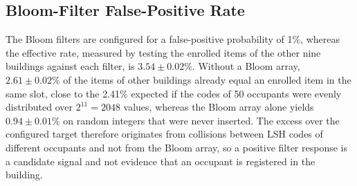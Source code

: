 \documentclass[pdflatex,sn-mathphys-num]{sn-jnl}%
\theoremstyle{thmstyleone}%
\theoremstyle{thmstyletwo}%
\theoremstyle{thmstylethree}%
\begin{document}
\begin{table}[!t]
\caption{Comparison of centralized (exhaustive) search and the verification policies for 10 buildings and a shortlist of five: mean over 20 random building assignments with 95\% confidence half-widths ($\pm$). The adaptive policy uses a score-gap threshold of 5: all five shortlisted buildings are verified when the top two routing scores differ by at most 5, and the sequential rule is used otherwise. Payload is the captured-embedding traffic per attempt (2.048~KB per building contacted).}
\label{tab:adaptive}
\small
\setlength{\tabcolsep}{3.5pt}
\renewcommand{\arraystretch}{1.25}
\end{table}

\subsection{Bloom-Filter False-Positive Rate}
\label{sec:fpr}

The Bloom filters are configured for a false-positive probability of 1\%, whereas the effective rate, measured by testing the enrolled items of the other nine buildings against each filter, is $3.54 \pm 0.02\%$. Without a Bloom array, $2.61 \pm 0.02\%$ of the items of other buildings already equal an enrolled item in the same slot, close to the 2.41\% expected if the codes of 50 occupants were evenly distributed over $2^{11}=2048$ values, whereas the Bloom array alone yields $0.94 \pm 0.01\%$ on random integers that were never inserted. The excess over the configured target therefore originates from collisions between LSH codes of different occupants and not from the Bloom array, so a positive filter response is a candidate signal and not evidence that an occupant is registered in the building.
\end{document}
